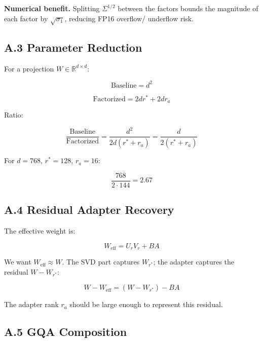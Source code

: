 \textbf{Numerical benefit.} Splitting $\Sigma^{1/2}$ between the factors bounds 
the magnitude of each factor by $\sqrt{\sigma_1}$, reducing FP16 overflow/
underflow risk.

\subsection{A.3 Parameter Reduction}

For a projection $W \in \mathbb{R}^{d \times d}$:

\begin{equation}
\text{Baseline} = d^2
\end{equation}

\begin{equation}
\text{Factorized} = 2 d r^* + 2 d r_a
\end{equation}

Ratio:

\begin{equation}
\frac{\text{Baseline}}{\text{Factorized}} = \frac{d^2}{2 d (r^* + r_a)} = \frac{d}{2(r^* + r_a)}
\end{equation}

For $d = 768$, $r^* = 128$, $r_a = 16$:

\begin{equation}
\frac{768}{2 \cdot 144} = 2.67
\end{equation}

\subsection{A.4 Residual Adapter Recovery}

The effective weight is:

\begin{equation}
W_\text{eff} = U_r V_r + B A
\end{equation}

We want $W_\text{eff} \approx W$. The SVD part captures $W_{r^*}$; the 
adapter captures the residual $W - W_{r^*}$:

\begin{equation}
W - W_\text{eff} = (W - W_{r^*}) - B A
\end{equation}

The adapter rank $r_a$ should be large enough to represent this residual.

\subsection{A.5 GQA Composition}

